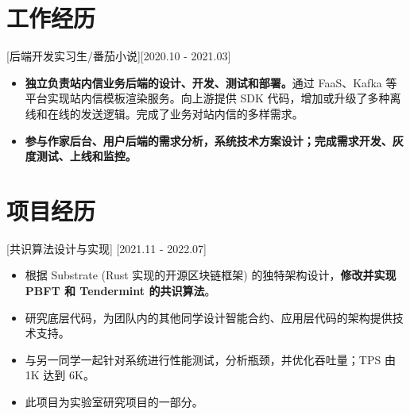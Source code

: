 \documentclass{resume}
\begin{document}
\section{工作经历}

[后端开发实习生/番茄小说][2020.10 - 2021.03] 
\begin{itemize}
  \item \textbf{独立负责站内信业务后端的设计、开发、测试和部署。}通过 FaaS、Kafka 等平台实现站内信模板渲染服务。向上游提供 SDK 代码，增加或升级了多种离线和在线的发送逻辑。完成了业务对站内信的多样需求。
  \item \textbf{参与作家后台、用户后端的需求分析，系统技术方案设计；完成需求开发、灰度测试、上线和监控。}
\end{itemize}


%
%
%
%

\section{项目经历}

[共识算法设计与实现]
[2021.11 - 2022.07] 

\begin{itemize}
  \item 根据 Substrate (Rust 实现的开源区块链框架) 的独特架构设计，\textbf{修改并实现 PBFT 和 Tendermint 的共识算法}。
  \item 研究底层代码，为团队内的其他同学设计智能合约、应用层代码的架构提供技术支持。
  \item 与另一同学一起针对系统进行性能测试，分析瓶颈，并优化吞吐量；TPS 由 1K 达到 6K。
  \item 此项目为实验室研究项目的一部分。
\end{itemize}
\end{document}
